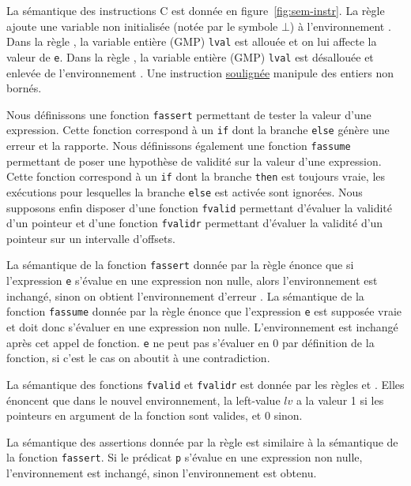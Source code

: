 

La sémantique des instructions C est donnée en figure~\ref{fig:sem-instr}.
La règle  ajoute une variable non initialisée (notée par le
symbole $\bot$) à l'environnement \env.
Dans la règle , la variable entière (GMP) \lstinline'lval' est
allouée et on lui affecte la valeur de \lstinline'e'.
Dans la règle , la variable entière (GMP) \lstinline'lval'
est désallouée et enlevée de l'environnement \env.
Une instruction \underline{soulignée} manipule des entiers non bornés.

Nous définissons une fonction \lstinline'fassert' permettant de tester la valeur
d'une expression.
Cette fonction correspond à un \lstinline'if' dont la branche
\lstinline'else' génère une erreur et la rapporte.
Nous définissons également une fonction \lstinline'fassume' permettant de poser
une hypothèse de validité sur la valeur d'une expression.
Cette fonction correspond à un \lstinline'if' dont
la branche \lstinline'then' est toujours vraie, les exécutions pour lesquelles
la branche \lstinline'else' est activée sont ignorées.
Nous supposons enfin disposer d'une fonction \lstinline'fvalid' permettant
d'évaluer la validité d'un pointeur et d'une fonction \lstinline'fvalidr'
permettant d'évaluer la validité d'un pointeur sur un intervalle d'offsets.

La sémantique de la fonction \lstinline'fassert' donnée par la règle
 énonce que si l'expression \lstinline'e' s'évalue en une
expression non nulle, alors l'environnement \env est inchangé, sinon on obtient
l'environnement d'erreur \errorenv.
La sémantique de la fonction \lstinline'fassume' donnée par la règle
 énonce que l'expression \lstinline'e' est supposée vraie et
doit donc s'évaluer en une expression non nulle.
L'environnement est inchangé après cet appel de fonction.
\lstinline'e' ne peut pas s'évaluer en 0 par définition de la fonction, si c'est
le cas on aboutit à une contradiction.

La sémantique des fonctions \lstinline'fvalid' et \lstinline'fvalidr' est donnée
par les règles  et .
Elles énoncent que dans le nouvel environnement, la left-value $lv$ a la valeur
1 si les pointeurs en argument de la fonction sont valides, et 0 sinon.

La sémantique des assertions \eacsl donnée par la règle  est
similaire à la sémantique de la fonction \lstinline'fassert'.
Si le prédicat \lstinline'p' s'évalue en une expression non nulle,
l'environnement \env est inchangé, sinon l'environnement \errorenv est obtenu.

